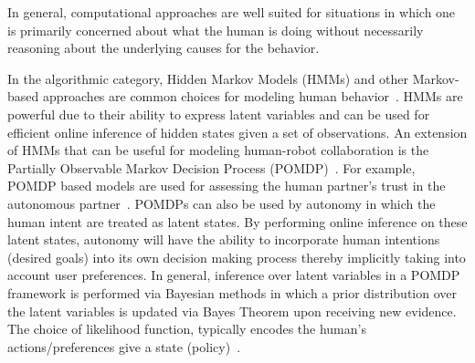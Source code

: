 \documentclass[12pt]{article}
\newcommand{\DGc}[1]{{\textbf{\color{blue}{#1}}}}
\begin{document}

In general, computational approaches are well suited for situations in which one is primarily concerned about what the human is doing without necessarily reasoning about the underlying causes for the behavior. 

In the algorithmic category, Hidden Markov Models (HMMs) and other Markov-based approaches are common choices for modeling human behavior~\cite{kelley2008understanding}. HMMs are powerful due to their ability to express latent variables and can be used for efficient online inference of hidden states given a set of observations. An extension of HMMs that can be useful for modeling human-robot collaboration is the Partially Observable Markov Decision Process (POMDP)~\cite{taha2011pomdp}. For example, POMDP based models are used for assessing the human partner's trust in the autonomous partner~\cite{chen2018planning}. 
POMDPs can also be used by autonomy in which the human intent are treated as latent states. By performing online inference on these latent states, autonomy will have the ability to incorporate human intentions (desired goals) into its own decision making process thereby implicitly taking into account user preferences. In general, inference over latent variables in a POMDP framework is performed via Bayesian methods in which a prior distribution over the latent variables is updated via Bayes Theorem upon receiving new evidence. The choice of likelihood function, typically encodes the human's actions/preferences give a state (policy)~\cite{dragan2012formalizing}. 
\end{document}
